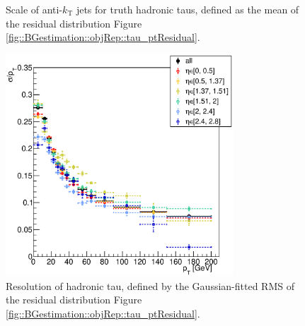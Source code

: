 \begin{figure}[htbp]
\begin{center}
\begin{minipage}[t]{.45\textwidth}
      \caption{Scale of anti-$k_{\mathrm{T}}$ jets for truth hadronic taus, defined as the mean of the residual distribution Figure \ref{fig::BGestimation::objRep::tau_ptResidual}.}
      \label{fig::BGestimation::objRep::tau_scale}
    \end{minipage}
    \hfill
    \begin{minipage}[t]{.45\textwidth}
      \centering
      \includegraphics[width=85mm]{figures/BGestimation/ObjReplacement/method/tauRF/tauJet_resol.eps}
      \caption{Resolution of hadronic tau, defined by the Gaussian-fitted RMS of the residual distribution Figure \ref{fig::BGestimation::objRep::tau_ptResidual}.}
      \label{fig::BGestimation::objRep::tau_resol}
    \end{minipage}
  \end{center}  
\end{figure}
\clearpage

